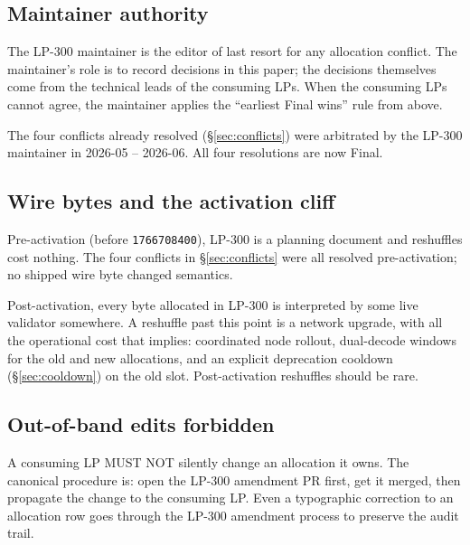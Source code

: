 \subsection{Maintainer authority}

The LP-300 maintainer is the editor of last resort for any allocation
conflict. The maintainer's role is to record decisions in this paper;
the decisions themselves come from the technical leads of the
consuming LPs. When the consuming LPs cannot agree, the maintainer
applies the ``earliest Final wins'' rule from above.

The four conflicts already resolved (\S\ref{sec:conflicts}) were
arbitrated by the LP-300 maintainer in 2026-05 -- 2026-06. All four
resolutions are now Final.

\subsection{Wire bytes and the activation cliff}

Pre-activation (before \texttt{1766708400}), LP-300 is a planning
document and reshuffles cost nothing. The four conflicts in
\S\ref{sec:conflicts} were all resolved pre-activation; no shipped
wire byte changed semantics.

Post-activation, every byte allocated in LP-300 is interpreted by
some live validator somewhere. A reshuffle past this point is a
network upgrade, with all the operational cost that implies:
coordinated node rollout, dual-decode windows for the old and new
allocations, and an explicit deprecation cooldown
(\S\ref{sec:cooldown}) on the old slot. Post-activation reshuffles
should be rare.

\subsection{Out-of-band edits forbidden}

A consuming LP MUST NOT silently change an allocation it owns. The
canonical procedure is: open the LP-300 amendment PR first, get it
merged, then propagate the change to the consuming LP. Even a
typographic correction to an allocation row goes through the LP-300
amendment process to preserve the audit trail.
